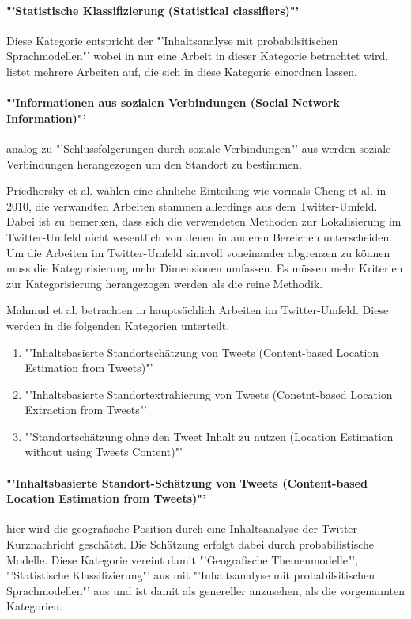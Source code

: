 		\paragraph*{"'Statistische Klassifizierung (Statistical classifiers)"'} Diese Kategorie entspricht der "'Inhaltsanalyse mit probabilsitischen Sprachmodellen"' wobei in \cite{Cheng2010} nur eine Arbeit in dieser Kategorie betrachtet wird. \cite{Priedhorsky2013} listet mehrere Arbeiten auf, die sich in diese Kategorie einordnen lassen.   

		\paragraph*{"'Informationen aus sozialen Verbindungen (Social Network Information)"'} analog zu "'Schlussfolgerungen durch soziale Verbindungen"' aus \cite{Cheng2010} werden soziale Verbindungen herangezogen um den Standort zu bestimmen. 

		Priedhorsky et al. wählen eine ähnliche Einteilung wie vormals Cheng et al. in 2010, die verwandten Arbeiten stammen allerdings aus dem Twitter-Umfeld. 
		Dabei ist zu bemerken, dass sich die verwendeten Methoden zur Lokalisierung im Twitter-Umfeld nicht wesentlich von denen in anderen Bereichen unterscheiden. 
		Um die Arbeiten im Twitter-Umfeld sinnvoll voneinander abgrenzen zu können muss die Kategorisierung mehr Dimensionen umfassen. 
		Es müssen mehr Kriterien zur Kategorisierung herangezogen werden als die reine Methodik.   

		Mahmud et al. betrachten in \cite{Mahmud2012} hauptsächlich Arbeiten im Twitter-Umfeld. 
		Diese werden in die folgenden Kategorien unterteilt. 

		\begin{enumerate}
			\item  "'Inhaltsbasierte Standortschätzung von Tweets (Content-based Location Estimation from Tweets)"'
			\item "'Inhaltsbasierte Standortextrahierung von Tweets (Conetnt-based Location Extraction from Tweets"'
			\item "'Standortschätzung ohne den Tweet Inhalt zu nutzen (Location Estimation without using Tweets Content)"'
		\end{enumerate}

		\paragraph*{"'Inhaltsbasierte Standort-Schätzung von Tweets (Content-based Location Estimation from Tweets)"'} hier wird die geografische Position durch eine Inhaltsanalyse der Twitter-Kurznachricht geschätzt. 
		Die Schätzung erfolgt dabei durch probabilistische Modelle.
		Diese Kategorie vereint damit "'Geografische Themenmodelle"', "'Statistische Klassifizierung"' aus \cite{Priedhorsky2013} mit "'Inhaltsanalyse mit probabilsitischen Sprachmodellen"' aus \cite{Cheng2010} und ist damit als genereller anzusehen, als die vorgenannten Kategorien. 

